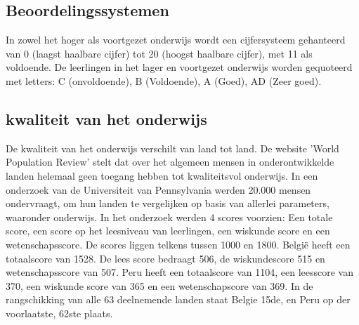 \subsection{Beoordelingssystemen}
In zowel het hoger als voortgezet onderwijs wordt een cijfersysteem gehanteerd van 0 (laagst haalbare cijfer) tot 20 (hoogst haalbare cijfer), met 11 als voldoende. De leerlingen in het lager en voortgezet onderwijs worden gequoteerd met letters: C (onvoldoende), B (Voldoende), A (Goed), AD (Zeer goed). \autocite{Nuffic2015}

\subsection{kwaliteit van het onderwijs}
De kwaliteit van het onderwijs verschilt van land tot land. \autocite{Review2020} De website 'World Population Review' stelt dat over het algemeen mensen in onderontwikkelde landen helemaal geen toegang hebben tot kwaliteitsvol onderwijs. 
In een onderzoek van de  Universiteit van Pennsylvania \autocite{UsNews2020} werden 20.000 mensen ondervraagt, om hun landen te vergelijken op basis van allerlei parameters, waaronder onderwijs. In het onderzoek werden 4 scores voorzien: Een totale score, een score op het leesniveau van leerlingen, een wiskunde score en een wetenschapsscore. De scores liggen telkens tussen 1000 en 1800. België heeft een totaalscore van 1528. De lees score bedraagt 506, de wiskundescore 515 en wetenschapsscore van 507. Peru heeft een totaalscore van 1104, een leesscore van 370, een wiskunde score van 365 en een wetenschapscore van 369. In de rangschikking van alle 63 deelnemende landen staat Belgie 15de, en Peru op der voorlaatste, 62ste plaats.




